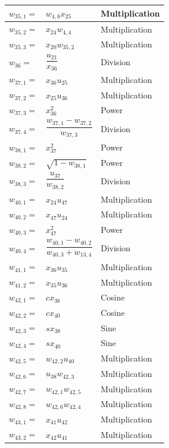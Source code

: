 \begin{longtable}{|p{1.5cm}|l|p{2cm}|}
$w_{35,1}=$ & $ w_{4,6}x_{25} $ & Multiplication \\ \hline 
$w_{35,2}=$ & $ x_{24}w_{4,4} $ & Multiplication \\ \hline 
$w_{35,3}=$ & $ x_{20}w_{35,2} $ & Multiplication\\ \hline 
$w_{36}=$ & $ \dfrac{u_{21}}{x_{36}} $ & Division \\ \hline 
$w_{37,1}=$ & $ x_{36}u_{25} $ & Multiplication \\ \hline 
$w_{37,2}=$ & $ x_{25}u_{36} $ & Multiplication \\ \hline 
$w_{37,3}=$ & $ x_{36}^{2} $ & Power \\ \hline 
$w_{37,4}=$ & $ \dfrac{w_{37,1}-w_{37,2}}{w_{37,3}} $ & Division \\ \hline 
$w_{38,1}=$ & $ x_{37}^{2} $ & Power \\ \hline 
$w_{38,2}=$ & $ \sqrt{1-w_{38,1}} $ & Power \\ \hline 
$w_{38,3}=$ & $ \dfrac{u_{37}}{w_{38,2}} $ & Division \\ \hline 
$w_{40,1}=$ & $ x_{24}u_{47} $ & Multiplication \\ \hline 
$w_{40,2}=$ & $ x_{47}u_{24} $ & Multiplication \\ \hline 
$w_{40,3}=$ & $ x_{47}^{2} $ & Power \\ \hline
$w_{40,4}=$ & $ \dfrac{w_{40,1}-w_{40,2}}{w_{40,3}+w_{13,4}} $ & Division \\ \hline
$w_{41,1}=$ & $ x_{36}u_{35} $ & Multiplication \\ \hline 
$w_{41,2}=$ & $ x_{35}u_{36} $ & Multiplication \\ \hline 
$w_{42,1}=$ & $ cx_{38} $ & Cosine \\ \hline 
$w_{42,2}=$ & $ cx_{40} $ & Cosine \\ \hline 
$w_{42,3}=$ & $ sx_{38} $ & Sine \\ \hline 
$w_{42,4}=$ & $ sx_{40} $ & Sine \\ \hline 
$w_{42,5}=$ & $ w_{42,2}u_{40} $ & Multiplication \\ \hline 
$w_{42,6}=$ & $ u_{38}w_{42,3} $ & Multiplication\\ \hline 
$w_{42,7}=$ & $ w_{42,1}w_{42,5} $ & Multiplication \\ \hline 
$w_{42,8}=$ & $ w_{42,6}w_{42,4} $ & Multiplication \\ \hline 
$w_{43,1}=$ & $ x_{41}u_{42} $ & Multiplication \\ \hline 
$w_{43,2}=$ & $ x_{42}u_{41} $ & Multiplication \\ \hline 

\end{longtable}
